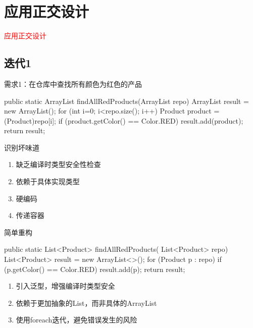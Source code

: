 \section{应用正交设计}
\label{sec:apply-orthogonal-design}

\begin{frame}
  \begin{center}
    \Huge{\textcolor{red}{应用正交设计}}
  \end{center}
\end{frame}

\subsection{迭代1}

\begin{frame}[fragile]{需求1：在仓库中查找所有颜色为红色的产品}
  \begin{java}
public static ArrayList findAllRedProducts(ArrayList repo) {
  ArrayList result = new ArrayList();
  for (int i=0; i<repo.size(); i++) {
    Product product = (Product)repo[i];
    if (product.getColor() == Color.RED) {
       result.add(product);
    }
  }
  return result;
}
  \end{java}
\end{frame}

\begin{frame}[fragile]{识别坏味道}
\begin{enumerate}
  \item 缺乏编译时类型安全性检查
  \item 依赖于具体实现类型
  \item 硬编码  
  \item 传递容器
\end{enumerate}
\end{frame}

\begin{frame}[fragile]{简单重构}
  \begin{java}
public static List<Product> findAllRedProducts(
  List<Product> repo) {
  List<Product> result = new ArrayList<>();
  for (Product p : repo) {
    if (p.getColor() == Color.RED) {
      result.add(p);
    }
  }
  return result;
}
  \end{java}

\begin{enumerate}
  \item 引入泛型，增强编译时类型安全
  \item 依赖于更加抽象的List，而非具体的ArrayList
  \item 使用foreach迭代，避免错误发生的风险
\end{enumerate}  
\end{frame}

